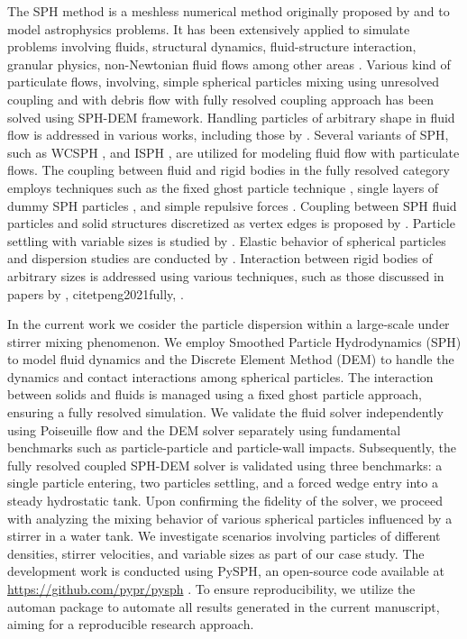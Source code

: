 \documentclass[preprint,12pt]{elsarticle}
\begin{document}
The SPH method is a meshless numerical method originally proposed by
\citet{gingold1977smoothed} and \citet{lucy1977numerical} to model
astrophysics problems. It has been extensively applied to simulate problems
involving fluids, structural dynamics, fluid-structure interaction, granular
physics, non-Newtonian fluid flows \cite{peng2021fully} among other areas
\cite{monaghan2012smoothed}.  Various kind of particulate flows, involving,
simple spherical particles mixing using unresolved coupling
\cite{cleary2015prediction, markauskas2019coupled} and with debris
flow \cite{canelas2016sph} with fully resolved coupling approach has been
solved using SPH-DEM framework.  Handling particles of arbitrary shape in
fluid flow is addressed in various works, including those by
\citet{peng2021fully, canelas2016sph, amicarelli2015smoothed}.  Several
variants of SPH, such as WCSPH \cite{peng2021fully, cleary2015}, and ISPH
\cite{asai2021fluid}, are utilized for modeling fluid flow with particulate
flows. The coupling between fluid and rigid bodies in the fully resolved
category employs techniques such as the fixed ghost particle technique
\cite{canelas2016sph, asai2021fluid}, single layers of dummy SPH particles
\cite{peng2021fully}, and simple repulsive forces
\cite{monaghan2009sph}. Coupling between SPH fluid particles and solid
structures discretized as vertex edges is proposed by
\cite{park2023new}. Particle settling with variable sizes is studied by
\citet{zou2022study}.  Elastic behavior of spherical particles and dispersion
studies are conducted by \citet{ng2021numerical}.  Interaction between rigid
bodies of arbitrary sizes is addressed using various techniques, such as those
discussed in papers by \citet{asai2021fluid}, citet{peng2021fully},
\citet{canelas2016sph}.



In the current work we cosider the particle dispersion within a large-scale
under stirrer mixing phenomenon. We employ Smoothed Particle Hydrodynamics
(SPH) to model fluid dynamics and the Discrete Element Method (DEM) to handle
the dynamics and contact interactions among spherical particles. The
interaction between solids and fluids is managed using a fixed ghost particle
approach, ensuring a fully resolved simulation. We validate the fluid solver
independently using Poiseuille flow and the DEM solver separately using
fundamental benchmarks such as particle-particle and particle-wall
impacts. Subsequently, the fully resolved coupled SPH-DEM solver is validated
using three benchmarks: a single particle entering, two particles settling,
and a forced wedge entry into a steady hydrostatic tank. Upon confirming the
fidelity of the solver, we proceed with analyzing the mixing behavior of
various spherical particles influenced by a stirrer in a water tank. We
investigate scenarios involving particles of different densities, stirrer
velocities, and variable sizes as part of our case study. The development work
is conducted using PySPH\cite{ramachandran2021pysph}, an open-source code
available at \url{https://github.com/pypr/pysph} . To ensure reproducibility,
we utilize the automan package \cite{ramachandran2018automan} to automate all
results generated in the current manuscript, aiming for a reproducible
research approach.
\end{document}
